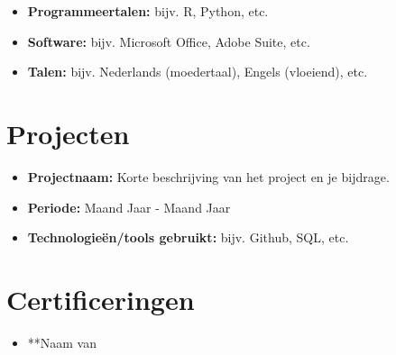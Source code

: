 \documentclass[
]{article}
\providecommand{\tightlist}{%
  \setlength{\itemsep}{0pt}\setlength{\parskip}{0pt}}
\begin{document}
\begin{itemize}
\tightlist
\item
  \textbf{Programmeertalen:} bijv. R, Python, etc.
\item
  \textbf{Software:} bijv. Microsoft Office, Adobe Suite, etc.
\item
  \textbf{Talen:} bijv. Nederlands (moedertaal), Engels (vloeiend), etc.
\end{itemize}

\hypertarget{projecten}{%
\section{Projecten}\label{projecten}}

\begin{itemize}
\tightlist
\item
  \textbf{Projectnaam:} Korte beschrijving van het project en je
  bijdrage.
\item
  \textbf{Periode:} Maand Jaar - Maand Jaar
\item
  \textbf{Technologieën/tools gebruikt:} bijv. Github, SQL, etc.
\end{itemize}

\hypertarget{certificeringen}{%
\section{Certificeringen}\label{certificeringen}}

\begin{itemize}
\tightlist
\item
  **Naam van
\end{itemize}
\end{document}
